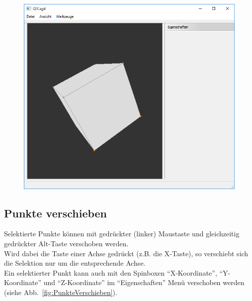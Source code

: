 \begin{figure}[H]
	\centering
	\includegraphics[scale=0.5]{content/pictures/3-ObjekteSelektieren}
	\caption{}
	\label{fig:ObjekteSelektieren}
\end{figure}

\subsection{Punkte verschieben}
Selektierte Punkte können mit gedrückter (linker) Maustaste und gleichzeitig gedrückter Alt-Taste verschoben werden.\\
Wird dabei die Taste einer Achse gedrückt (z.B. die X-Taste), so verschiebt sich die Selektion nur um die entsprechende Achse.\\
Ein selektierter Punkt kann auch mit den Spinboxen "`X-Koordinate"', "`Y-Koordinate"' und "`Z-Koordinate"' im "`Eigenschaften"' Menü verschoben werden (siehe Abb.~\ref{fig:PunkteVerschieben}).

